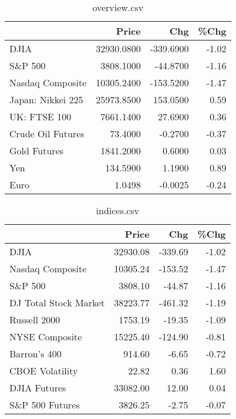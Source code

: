 \documentclass{article}%
\begin{document}
\begin{table}[htbp]%
\caption{overview.csv}%
\centering%
\begin{adjustbox}{width=1\textwidth}%
\begin{tabular}{lrrr}
\toprule
                  &      Price &       Chg &  \%Chg \\
\midrule
             DJIA & 32930.0800 & -339.6900 & -1.02 \\
          S\&P 500 &  3808.1000 &  -44.8700 & -1.16 \\
 Nasdaq Composite & 10305.2400 & -153.5200 & -1.47 \\
Japan: Nikkei 225 & 25973.8500 &  153.0500 &  0.59 \\
     UK: FTSE 100 &  7661.1400 &   27.6900 &  0.36 \\
Crude Oil Futures &    73.4000 &   -0.2700 & -0.37 \\
     Gold Futures &  1841.2000 &    0.6000 &  0.03 \\
              Yen &   134.5900 &    1.1900 &  0.89 \\
             Euro &     1.0498 &   -0.0025 & -0.24 \\
\bottomrule
\end{tabular}
%
\end{adjustbox}%
\end{table}

%


\begin{table}[htbp]%
\caption{indices.csv}%
\centering%
\begin{adjustbox}{width=1\textwidth}%
\begin{tabular}{lrrr}
\toprule
                      &    Price &     Chg &  \%Chg \\
\midrule
                 DJIA & 32930.08 & -339.69 & -1.02 \\
     Nasdaq Composite & 10305.24 & -153.52 & -1.47 \\
              S\&P 500 &  3808.10 &  -44.87 & -1.16 \\
DJ Total Stock Market & 38223.77 & -461.32 & -1.19 \\
         Russell 2000 &  1753.19 &  -19.35 & -1.09 \\
       NYSE Composite & 15225.40 & -124.90 & -0.81 \\
         Barron's 400 &   914.60 &   -6.65 & -0.72 \\
      CBOE Volatility &    22.82 &    0.36 &  1.60 \\
         DJIA Futures & 33082.00 &   12.00 &  0.04 \\
      S\&P 500 Futures &  3826.25 &   -2.75 & -0.07 \\
\bottomrule
\end{tabular}
%
\end{adjustbox}%
\end{table}
\end{document}
